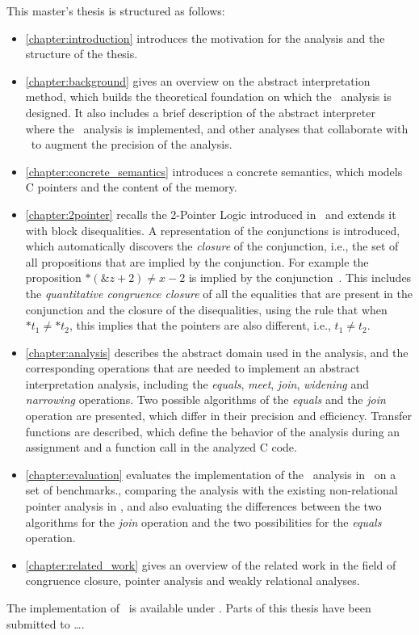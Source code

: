 This master's thesis is structured as follows:
\begin{itemize}
    \item \cref{chapter:introduction} introduces the motivation for the analysis and the structure of the thesis.
    \item \cref{chapter:background} gives an overview on the abstract interpretation method, which builds the theoretical foundation on which the \cpo\ analysis is designed.
    It also includes a brief description of the abstract interpreter \goblint\, where the \cpo\ analysis is implemented, and other analyses that collaborate with \cpo\ to augment the precision of the analysis.
    \item \cref{chapter:concrete_semantics} introduces a concrete semantics, which models C pointers and the content of the memory.
    \item \cref{chapter:2pointer} recalls the 2-Pointer Logic introduced in~\cite{2pointer} and extends it with block disequalities.
    A representation of the conjunctions is introduced, which automatically discovers the \emph{closure} of the conjunction,
    i.e., the set of all propositions that are implied by the conjunction.
    For example the proposition $*(\&z + 2) \neq x - 2$ is implied by the conjunction~.
    This includes the \emph{quantitative congruence closure} of all the equalities that are present in the conjunction and
    the closure of the disequalities, using the rule that when $*t_1 \neq *t_2$, this implies that the pointers are also different, i.e., $t_1 \neq t_2$.
    \item \cref{chapter:analysis} describes the abstract domain used in the analysis, and the corresponding operations that are needed to implement an abstract interpretation analysis, including the \emph{equals}, \emph{meet}, \emph{join}, \emph{widening} and \emph{narrowing} operations.
    Two possible algorithms of the \emph{equals} and the \emph{join} operation are presented, which differ in
    their precision and efficiency.
    Transfer functions are described, which define the behavior of the analysis during an assignment and a function call in the analyzed C code.
    \item \cref{chapter:evaluation} evaluates the implementation of the \cpo\ analysis in \goblint\ on a set of benchmarks.,
    comparing the analysis with the existing non-relational pointer analysis in \goblint, and also
    evaluating the differences between the two algorithms for the \emph{join} operation and the two possibilities for the \emph{equals} operation.
    \item \cref{chapter:related_work} gives an overview of the related work in the field of congruence closure, pointer analysis and weakly relational analyses.
\end{itemize}

The implementation of \cpo\ is available under . Parts of this thesis have been submitted to \dots.
